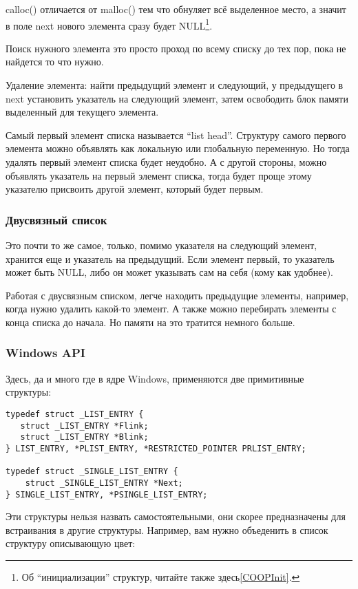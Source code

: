 calloc() отличается от malloc() тем что обнуляет всё выделенное место, а значит в поле next нового
элемента сразу будет NULL\footnote{Об ``инициализации'' структур, читайте также здесь\ref{COOPInit}.}.

Поиск нужного элемента это просто проход по всему списку до тех пор, пока не найдется то что нужно.

Удаление элемента: найти предыдущий элемент и следующий, 
у предыдущего в next установить указатель на следующий элемент, 
затем освободить блок памяти выделенный для текущего элемента.

Самый первый элемент списка называется ``list head''. Структуру самого первого элемента можно объявлять как локальную
или глобальную переменную. Но тогда удалять первый элемент списка будет неудобно. А с другой стороны,
можно объявлять указатель на первый элемент списка, тогда будет проще этому указателю присвоить другой элемент,
который будет первым.

\subsubsection{Двусвязный список}

Это почти то же самое, только, помимо указателя на следующий элемент, хранится еще и указатель на предыдущий.
Если элемент первый, то указатель может быть NULL, либо он может указывать сам на себя (кому как удобнее).

Работая с двусвязным списком, легче находить предыдущие элементы, например, когда нужно удалить какой-то элемент.
А также можно перебирать элементы с конца списка до начала.
Но памяти на это тратится немного больше.

\subsubsection{Windows API}

Здесь, да и много где в ядре Windows, применяются две примитивные структуры:

\begin{lstlisting}
typedef struct _LIST_ENTRY {
   struct _LIST_ENTRY *Flink;
   struct _LIST_ENTRY *Blink;
} LIST_ENTRY, *PLIST_ENTRY, *RESTRICTED_POINTER PRLIST_ENTRY;

typedef struct _SINGLE_LIST_ENTRY {
    struct _SINGLE_LIST_ENTRY *Next;
} SINGLE_LIST_ENTRY, *PSINGLE_LIST_ENTRY;
\end{lstlisting}

Эти структуры нельзя назвать самостоятельными, они скорее предназначены для встраивания в другие структуры.
Например, вам нужно объеденить в список структуру описывающую цвет:

